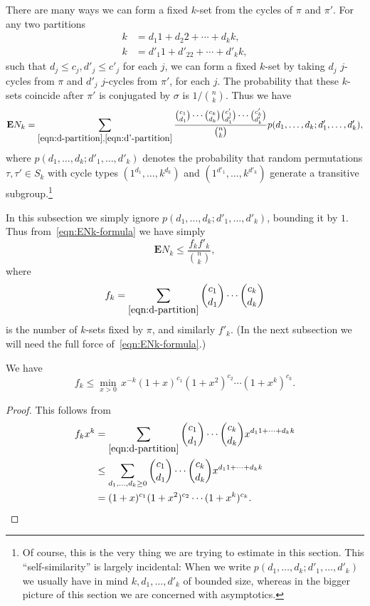 \documentclass[ALCO,ThmDefs,Unicode,epreuves]{cedram}
\newcommand\E{\mathbf{E}}
\begin{document}
There are many ways we can form a fixed $k$-set from the cycles of $\pi$ and $\pi'$. For any two partitions
\begin{align}
 k &= d_1 1 + d_2 2 + \cdots + d_k k, \label{eqn:d-partition}\\
 k &= d'_1 1 + d'_22 + \cdots + d'_k k, \label{eqn:d'-partition}
\end{align}
such that $d_j \leq c_j, d'_j \leq c'_j$ for each $j$, we can form a fixed $k$-set by taking $d_j$ $j$-cycles from $\pi$ and $d'_j$ $j$-cycles from $\pi'$, for each $j$. The probability that these $k$-sets coincide after $\pi'$ is conjugated by $\sigma$ is $1 / \binom{n}{k}$. Thus we have
\begin{equation} \label{eqn:ENk-formula}
 \E N_k = \sum_{\eqref{eqn:d-partition}, \eqref{eqn:d'-partition}} \frac{\binom{c_1}{d_1} \cdots \binom{c_k}{d_k} \binom{c'_1}{d'_1} \cdots \binom{c'_k}{d'_k}}{\binom{n}{k}} p(d_1, \dots, d_k ; d'_1, \dots, d'_k),
\end{equation}
where $p(d_1, \dots, d_k ; d'_1, \dots, d'_k)$ denotes the probability that random permutations $\tau, \tau' \in S_k$ with cycle types $(1^{d_1}, \dots, k^{d_k})$ and $(1^{d'_1}, \dots, k^{d'_k})$ generate a transitive subgroup.\footnote{Of course, this is the very thing we are trying to estimate in this section. This ``self-similarity'' is largely incidental: When we write $p(d_1, \dots, d_k ; d'_1, \dots, d'_k)$ we usually have in mind $k, d_1, \dots, d'_k$ of bounded size, whereas in the bigger picture of this section we are concerned with asymptotics.}

In this subsection we simply ignore $p(d_1, \dots, d_k ; d'_1, \dots, d'_k)$, bounding it by $1$. Thus from~\eqref{eqn:ENk-formula} we have simply
\[
 \E N_k \leq \frac{ f_k f'_k }{\binom{n}{k}},
\]
where
\begin{equation}\label{fk}
 f_k = \sum_{\eqref{eqn:d-partition}} \binom{c_1}{d_1} \cdots \binom{c_k}{d_k}
\end{equation}
is the number of $k$-sets fixed by $\pi$, and similarly $f'_k$. (In the next subsection we will need the full force of~\eqref{eqn:ENk-formula}.)

\begin{lemma} \label{lem:fkx-bound}
We have
\[
 f_k \leq \min_{x > 0}\, x^{-k} (1+x)^{c_1} (1+x^2)^{c_2} \cdots (1+x^k)^{c_k}.
\]
\end{lemma}
\begin{proof}
This follows from
\begin{align*}
 f_k x^k
 &= \sum_{\eqref{eqn:d-partition}} \binom{c_1}{d_1} \cdots \binom{c_k}{d_k} x^{d_1 1 + \cdots + d_k k} \\
 &\leq \sum_{d_1, \dots, d_k\geq 0} \binom{c_1}{d_1} \cdots \binom{c_k}{d_k} x^{d_1 1 + \cdots + d_k k} \\
 &= (1+x)^{c_1} (1+x^2)^{c_2} \cdots (1+x^k)^{c_k}.\qedhere
\end{align*}
\end{proof}
\end{document}
